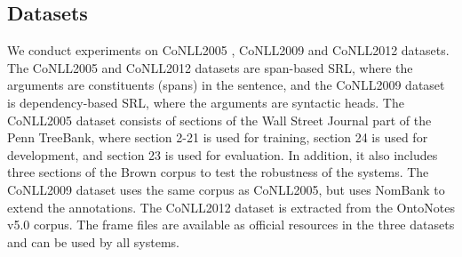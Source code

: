 \documentclass[11pt]{article}
\begin{document}
\begin{table}
\centering
{}
\caption{Argument labeling results on CoNLL2009.}
\label{tab:dep}
\end{table}


\subsection{Datasets}
We conduct experiments on CoNLL2005 \cite{carreras2005introduction}, CoNLL2009 \cite{hajic-etal-2009-conll} and CoNLL2012 \cite{pradhan2013towards} datasets. The CoNLL2005 and CoNLL2012 datasets are span-based SRL, where the arguments are constituents (spans) in the sentence, and the CoNLL2009 dataset is dependency-based SRL, where the arguments are syntactic heads. The CoNLL2005 dataset consists of sections of the Wall Street Journal part of the Penn TreeBank, where section 2-21 is used for training, section 24 is used for development, and section 23 is used for evaluation. In addition, it also includes three sections of the Brown corpus to test the robustness of the systems. The CoNLL2009 dataset uses the same corpus as CoNLL2005, but uses NomBank to extend the annotations. The CoNLL2012 dataset is extracted from the OntoNotes v5.0 corpus. The frame files are available as official resources in the three datasets and can be used by all systems.
\end{document}
